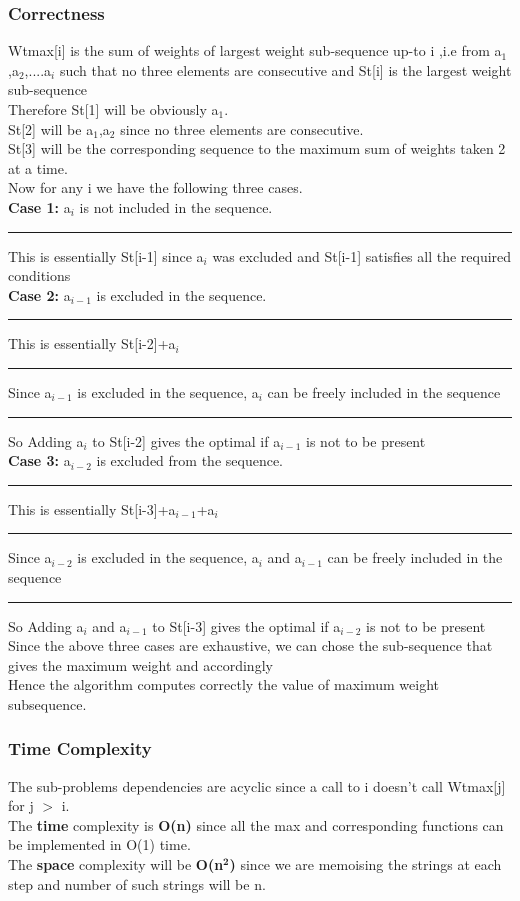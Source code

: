 \documentclass{report}
\begin{document}
 \subsubsection*{Correctness}
 Wtmax[i] is the sum of weights of largest weight sub-sequence up-to i ,i.e from a$_1$,a$_2$,....a$_i$ such that no three elements are consecutive and St[i] is the largest weight sub-sequence\\
 Therefore St[1] will be obviously a$_1$.\\
 St[2] will be a$_1$,a$_2$ since no three elements are consecutive.\\
 St[3] will be the corresponding sequence to the maximum sum of weights taken 2 at a time.\\
 Now for any i we have the following three cases.\\
 \textbf{Case 1:} a$_i$ is not included in the sequence.\\
 \rule[0.5mm]{1.25cm}{0pt} This is essentially St[i-1] since a$_i$ was excluded and St[i-1] satisfies all the required conditions\\
 \textbf{Case 2:} a$_{i-1}$ is excluded in the sequence.\\ 
 \rule[0.5mm]{1.25cm}{0pt} This is essentially St[i-2]+a$_i$\\
 \rule[0.5mm]{1.25cm}{0pt} Since a$_{i-1}$ is excluded in the sequence, a$_i$ can be freely included in the sequence\\
 \rule[0.5mm]{1.25cm}{0pt} So Adding a$_i$ to St[i-2] gives the optimal if a$_{i-1}$ is not to be present\\
 \textbf{Case 3:} a$_{i-2}$ is excluded from the sequence.\\
 \rule[0.5mm]{1.25cm}{0pt} This is essentially St[i-3]+a$_{i-1}$+a$_i$\\
 \rule[0.5mm]{1.25cm}{0pt} Since a$_{i-2}$ is excluded in the sequence, a$_i$ and a$_{i-1}$ can be freely included in the sequence\\
 \rule[0.5mm]{1.25cm}{0pt} So Adding a$_i$ and a$_{i-1}$ to St[i-3] gives the optimal if a$_{i-2}$ is not to be present\\
 Since the above three cases are exhaustive, we can chose the sub-sequence that gives the maximum weight and accordingly\\
 Hence the algorithm computes correctly the value of maximum weight subsequence.
 \subsubsection*{Time Complexity}
 The sub-problems dependencies are acyclic since a call to i doesn't call Wtmax[j] for j $>$ i.\\
The \textbf{time} complexity is \textbf{O(n)} since all the max and corresponding functions can be implemented in O(1) time.\\
 The \textbf{space} complexity will be \textbf{O(n$^\mathbf{2}$)} since we are memoising the strings at each step and number of such strings will be n.
 
\end{document}
